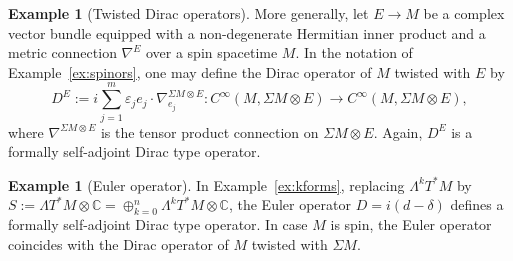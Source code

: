 \documentclass[a4paper,11pt]{amsart}
\theoremstyle{definition}
\newtheorem{ex}[thm]{Example}
\begin{document}
\begin{ex}[Twisted Dirac operators]\label{ex:twistedDirac}
More generally, let $E\to M$ be a complex vector bundle equipped with a non-degenerate Hermitian inner product and a metric connection $\nabla^E$ over a spin spacetime $M$.
In the notation of Example~\ref{ex:spinors}, one may define the Dirac operator of $M$ twisted with $E$ by $$
D^E:=i\sum_{j=1}^m{\varepsilon}_j e_j\cdot{\nabla}_{e_j}^{\Sigma M\otimes E}:{C^\infty}(M,\Sigma M\otimes E)\to{C^\infty}(M,\Sigma M\otimes E),
$$
where ${\nabla}^{\Sigma M\otimes E}$ is the tensor product connection on $\Sigma M\otimes E$.
Again, $D^E$ is a formally self-adjoint Dirac type operator.
\end{ex}

\begin{ex}[Euler operator]\label{ex:Euler}
In Example~\ref{ex:kforms}, replacing $\Lambda^kT^*M$ by $S:=\Lambda T^*M\otimes{\mathbb{C}} = \oplus_{k=0}^n\Lambda^kT^*M\otimes{\mathbb{C}}$, the Euler operator $D=i(d-\delta)$ defines a formally self-adjoint Dirac type operator.
In case $M$ is spin, the Euler operator coincides with the Dirac operator of $M$ twisted with $\Sigma M$.
\end{ex} 
\end{document}
